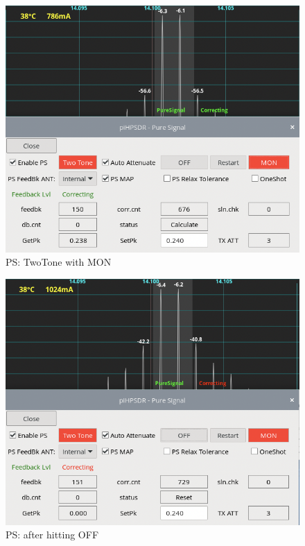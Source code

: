 \documentclass[12pt]{book}
\begin{document}
\begin{figure}[t!]
\center
\includegraphics[scale=0.45]{PSmon.png}
\caption{PS: TwoTone with MON}
\label{fig:PSmon}
\end{figure}

\begin{figure}[t!]
\center
\includegraphics[scale=0.45]{PSoff.png}
\caption{PS: after hitting OFF}
\label{fig:PSoff}
\end{figure}
\end{document}
